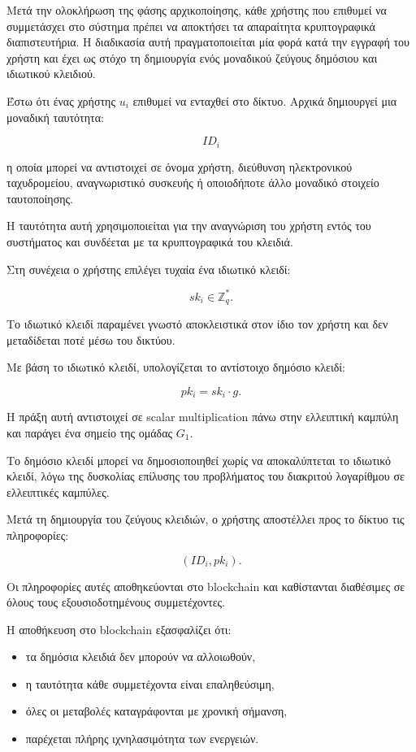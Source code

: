 \documentclass[12pt,a4paper]{report}
\begin{document}
Μετά την ολοκλήρωση της φάσης αρχικοποίησης, κάθε χρήστης που επιθυμεί να συμμετάσχει στο σύστημα πρέπει να αποκτήσει τα απαραίτητα κρυπτογραφικά διαπιστευτήρια. Η διαδικασία αυτή πραγματοποιείται μία φορά κατά την εγγραφή του χρήστη και έχει ως στόχο τη δημιουργία ενός μοναδικού ζεύγους δημόσιου και ιδιωτικού κλειδιού.

Έστω ότι ένας χρήστης $u_i$ επιθυμεί να ενταχθεί στο δίκτυο. Αρχικά δημιουργεί μια μοναδική ταυτότητα:

\[
ID_i
\]

η οποία μπορεί να αντιστοιχεί σε όνομα χρήστη, διεύθυνση ηλεκτρονικού ταχυδρομείου, αναγνωριστικό συσκευής ή οποιοδήποτε άλλο μοναδικό στοιχείο ταυτοποίησης.

Η ταυτότητα αυτή χρησιμοποιείται για την αναγνώριση του χρήστη εντός του συστήματος και συνδέεται με τα κρυπτογραφικά του κλειδιά.

Στη συνέχεια ο χρήστης επιλέγει τυχαία ένα ιδιωτικό κλειδί:

\[
sk_i \in \mathbb{Z}_q^{*}.
\]

Το ιδιωτικό κλειδί παραμένει γνωστό αποκλειστικά στον ίδιο τον χρήστη και δεν μεταδίδεται ποτέ μέσω του δικτύου.

Με βάση το ιδιωτικό κλειδί, υπολογίζεται το αντίστοιχο δημόσιο κλειδί:

\[
pk_i = sk_i \cdot g.
\]

Η πράξη αυτή αντιστοιχεί σε scalar multiplication πάνω στην ελλειπτική καμπύλη και παράγει ένα σημείο της ομάδας $G_1$.

Το δημόσιο κλειδί μπορεί να δημοσιοποιηθεί χωρίς να αποκαλύπτεται το ιδιωτικό κλειδί, λόγω της δυσκολίας επίλυσης του προβλήματος του διακριτού λογαρίθμου σε ελλειπτικές καμπύλες.

Μετά τη δημιουργία του ζεύγους κλειδιών, ο χρήστης αποστέλλει προς το δίκτυο τις πληροφορίες:

\[
(ID_i, pk_i).
\]

Οι πληροφορίες αυτές αποθηκεύονται στο blockchain και καθίστανται διαθέσιμες σε όλους τους εξουσιοδοτημένους συμμετέχοντες.

Η αποθήκευση στο blockchain εξασφαλίζει ότι:

\begin{itemize}
\item τα δημόσια κλειδιά δεν μπορούν να αλλοιωθούν,
\item η ταυτότητα κάθε συμμετέχοντα είναι επαληθεύσιμη,
\item όλες οι μεταβολές καταγράφονται με χρονική σήμανση,
\item παρέχεται πλήρης ιχνηλασιμότητα των ενεργειών.
\end{itemize}
\end{document}
